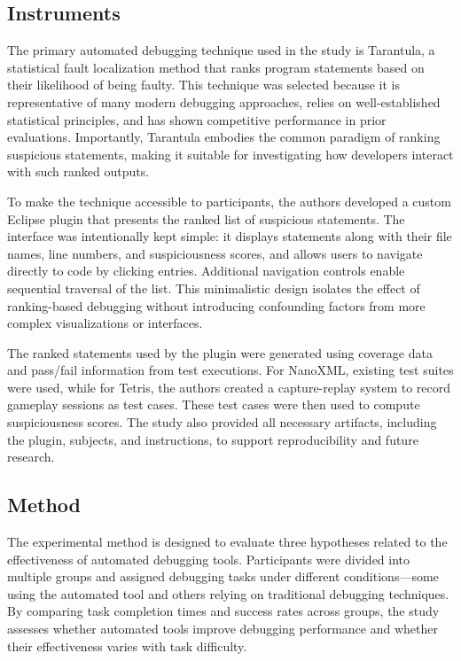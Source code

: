 \subsection{Instruments}
The primary automated debugging technique used in the study is Tarantula, a statistical fault localization method that ranks program statements based on their likelihood of being faulty. This technique was selected because it is representative of many modern debugging approaches, relies on well-established statistical principles, and has shown competitive performance in prior evaluations. Importantly, Tarantula embodies the common paradigm of ranking suspicious statements, making it suitable for investigating how developers interact with such ranked outputs.

To make the technique accessible to participants, the authors developed a custom Eclipse plugin that presents the ranked list of suspicious statements. The interface was intentionally kept simple: it displays statements along with their file names, line numbers, and suspiciousness scores, and allows users to navigate directly to code by clicking entries. Additional navigation controls enable sequential traversal of the list. This minimalistic design isolates the effect of ranking-based debugging without introducing confounding factors from more complex visualizations or interfaces.

The ranked statements used by the plugin were generated using coverage data and pass/fail information from test executions. For NanoXML, existing test suites were used, while for Tetris, the authors created a capture-replay system to record gameplay sessions as test cases. These test cases were then used to compute suspiciousness scores. The study also provided all necessary artifacts, including the plugin, subjects, and instructions, to support reproducibility and future research.

\subsection{Method}
The experimental method is designed to evaluate three hypotheses related to the effectiveness of automated debugging tools. Participants were divided into multiple groups and assigned debugging tasks under different conditions—some using the automated tool and others relying on traditional debugging techniques. By comparing task completion times and success rates across groups, the study assesses whether automated tools improve debugging performance and whether their effectiveness varies with task difficulty.

